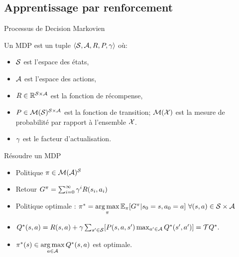 \documentclass[french,handout]{beamer}
\begin{document}
    \subsection{Apprentissage par renforcement}
    \begin{frame}{Processus de Decision Markovien}

        Un MDP est un tuple $\langle{}\mathcal{S},\mathcal{A},R,P,\gamma\rangle{}$ où:
        \begin{itemize}
            \item  $\mathcal{S}$ est l'espace des états,
            \item  $\mathcal{A}$ est l'espace des actions,
            \item $R\in\mathbb{R}^{\mathcal{S} \times \mathcal{A}}$ est la fonction de récompense,
            \item $P\in \mathcal{M}(\mathcal{S})^{\mathcal{S} \times \mathcal{A}}$ est la fonction de transition; $\mathcal{M}(\mathcal{X})$ est la mesure de probabilité par rapport à l'ensemble $\mathcal{X}$.
            \item $\gamma$ est le facteur d'actualisation.
        \end{itemize}

    \end{frame}

    \begin{frame}{Résoudre un MDP}
        \begin{itemize}
            \item Politique $\pi\in\mathcal{M}(\mathcal{A})^{\mathcal{S}}$ %
            \item Retour $G^{\pi} = \sum_{i=0}^\infty \gamma^{i} R(s_{i},a_{i})$%
            \item Politique optimale :  $\pi^* = \operatorname*{arg\,max}\limits_{\pi} \mathbb{E}_{\pi} [G^{\pi}|s_0=s,a_0=a]\ \forall (s,a) \in \mathcal{S}\times\mathcal{A}$

            \item $Q^*(s,a)=R(s,a) +\gamma \sum_{s'\in \mathcal{S}}[P(s,a,s')\max_{a'\in \mathcal{A}}Q^*(s',a')] = \mathcal{T} Q^*.$

            \item $\pi^*(s) \in \operatorname*{arg\,max}\limits_{a\in \mathcal{A}} Q^*(s,a)$ est optimale.
        \end{itemize}


    \end{frame}
\end{document}
